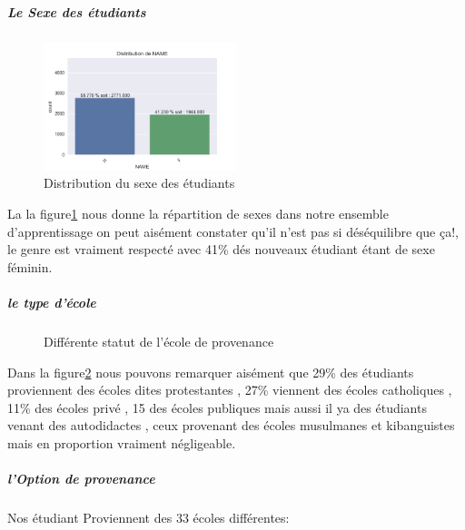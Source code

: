 \subparagraph{Le Sexe des étudiants}
	\begin{figure}[!htbp]
	\centering
	\includegraphics[width=0.5\textwidth]{fig/NAME.png}
	\caption[Short caption]{Distribution du sexe des étudiants }
	\label{fig:SEXE}
\end{figure}
La  la figure\ref{fig:SEXE} nous donne la  répartition de sexes dans notre ensemble d'apprentissage on peut aisément constater qu'il n'est pas si déséquilibre que ça!, le
genre est vraiment respecté avec 41\% dés nouveaux étudiant étant de
sexe féminin.
\subparagraph{le type d'école}
\begin{figure}[!htbp]
	\centering
	\caption[Short caption]{Différente statut de l'école de provenance }
	\label{fig:SchoolStatus}
\end{figure}
 Dans la figure\ref{fig:SchoolStatus} nous pouvons remarquer aisément que 29\% des étudiants
proviennent des écoles dites protestantes , 27\% viennent des écoles
catholiques , 11\% des écoles privé , 15 des écoles publiques mais aussi
il ya des étudiants venant des autodidactes , ceux provenant des écoles
musulmanes et kibanguistes mais en proportion vraiment négligeable.
\subparagraph{l'Option de provenance}
Nos étudiant Proviennent des 33 écoles différentes:

